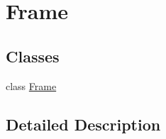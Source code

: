 \hypertarget{group___frame}{}\section{Frame}
\label{group___frame}
\subsection*{Classes}
\begin{DoxyCompactItemize}
\item 
class \mbox{\hyperlink{class_frame}{Frame}}
\end{DoxyCompactItemize}


\subsection{Detailed Description}

